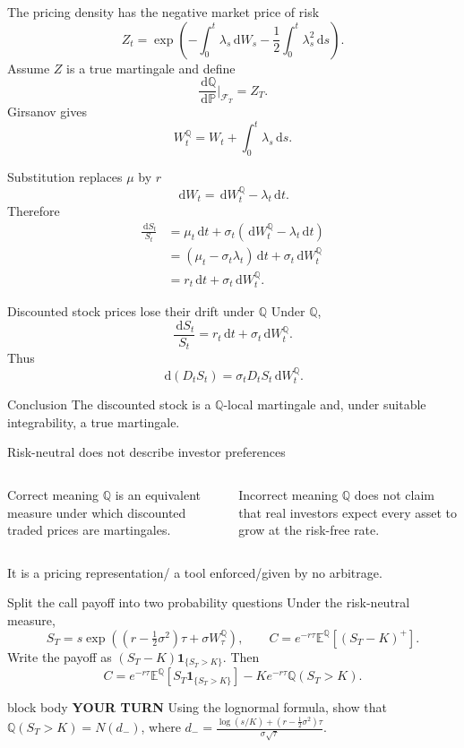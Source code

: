 \documentclass[handout,10pt,aspectratio=169]{beamer}
\newenvironment{pausebox}{\begin{beamercolorbox}[rounded=true,sep=0.8em,wd=\textwidth]{block body}
  \textbf{\color{CourseGold}YOUR TURN}\quad}{\end{beamercolorbox}}
\newcommand{\dd}{\,\mathrm d}
\newcommand{\E}{\mathbb E}
\newcommand{\Pp}{\mathbb P}
\newcommand{\Q}{\mathbb Q}
\newcommand{\cF}{\mathcal F}
\newcommand{\1}{\mathbf 1}
\begin{document}
\begin{frame}{The pricing density has the negative market price of risk}
\[
\boxed{
Z_t=\exp\!\left(
-\int_0^t\lambda_s\dd W_s
-\frac12\int_0^t\lambda_s^2\dd s
\right).}
\]
Assume \(Z\) is a true martingale and define
\[
\frac{\dd\Q}{\dd\Pp}\bigg|_{\cF_T}=Z_T.
\]
Girsanov gives
\[
\boxed{W_t^\Q=W_t+\int_0^t\lambda_s\dd s.}
\]
\end{frame}

\begin{frame}{Substitution replaces \(\mu\) by \(r\)}
\[
\dd W_t=\dd W_t^\Q-\lambda_t\dd t.
\]
Therefore
\[
\begin{aligned}
\frac{\dd S_t}{S_t}
&=\mu_t\dd t+\sigma_t(\dd W_t^\Q-\lambda_t\dd t)\\
&=(\mu_t-\sigma_t\lambda_t)\dd t+\sigma_t\dd W_t^\Q\\
&=\boxed{r_t\dd t+\sigma_t\dd W_t^\Q}.
\end{aligned}
\]
\end{frame}

\begin{frame}{Discounted stock prices lose their drift under \(\Q\)}
Under \(\Q\),
\[
\frac{\dd S_t}{S_t}=r_t\dd t+\sigma_t\dd W_t^\Q.
\]
Thus
\[
\boxed{
\dd(D_tS_t)=\sigma_tD_tS_t\dd W_t^\Q.}
\]
\begin{block}{Conclusion}
The discounted stock is a \(\Q\)-local martingale and, under suitable
integrability, a true martingale.
\end{block}
\end{frame}

\begin{frame}{Risk-neutral does not describe investor preferences}
\begin{columns}[T,onlytextwidth]
\begin{block}{Correct meaning}
\(\Q\) is an equivalent measure under which discounted traded prices are
martingales.
\end{block}
\begin{alertblock}{Incorrect meaning}
\(\Q\) does not claim that real investors expect every asset to grow at
the risk-free rate.
\end{alertblock}
\end{columns}
\medskip
It is a pricing representation/ a tool enforced/given by no arbitrage.
\end{frame}

\begin{frame}{Split the call payoff into two probability questions}
Under the risk-neutral measure,
\[
S_T=s\exp\!\left((r-\tfrac12\sigma^2)\tau+\sigma W_\tau^\Q\right),
\qquad C=e^{-r\tau}\E^\Q[(S_T-K)^+].
\]
Write the payoff as \((S_T-K)\1_{\{S_T>K\}}\). Then
\[
C=e^{-r\tau}\E^\Q[S_T\1_{\{S_T>K\}}]
  -Ke^{-r\tau}\Q(S_T>K).
\]
\begin{pausebox}
Using the lognormal formula, show that
\(\Q(S_T>K)=N(d_-)\), where
\(d_-=\frac{\log(s/K)+(r-\frac12\sigma^2)\tau}
{\sigma\sqrt\tau}\).
\end{pausebox}
\end{frame}
\end{document}
